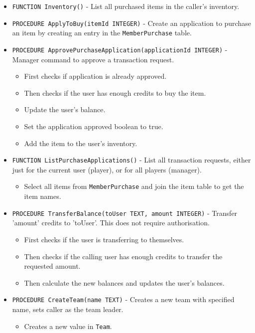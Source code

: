 \begin{itemize}
    \item \verb|FUNCTION Inventory()| - List all purchased items in the caller's inventory.
    \item \verb|PROCEDURE ApplyToBuy(itemId INTEGER)| - Create an application to purchase an item by creating an entry in the \verb|MemberPurchase| table.
    \item \verb|PROCEDURE ApprovePurchaseApplication(applicationId INTEGER)| - Manager command to approve a transaction request.
        \begin{itemize}
            \item First checks if application is already approved.
            \item Then checks if the user has enough credits to buy the item.
            \item Update the user's balance.
            \item Set the application approved boolean to true.
            \item Add the item to the user's inventory.
        \end{itemize}
    \item \verb|FUNCTION ListPurchaseApplications()| - List all transaction requests, either just for the current user (player), or for all players (manager).
        \begin{itemize}
            \item Select all items from \verb|MemberPurchase| and join the item table to get the item names.
        \end{itemize}
    \item \verb|PROCEDURE TransferBalance(toUser TEXT, amount INTEGER)| - Transfer 'amount' credits to 'toUser'. This does not require authorisation.
        \begin{itemize}
            \item First checks if the user is transferring to themselves.
            \item Then checks if the calling user has enough credits to transfer the requested amount.
            \item Then calculate the new balances and updates the user's balances.
        \end{itemize}
    \item \verb|PROCEDURE CreateTeam(name TEXT)| - Creates a new team with specified name, sets caller as the team leader.
        \begin{itemize}
            \item Creates a new value in \verb|Team|.

\end{itemize}
\end{itemize}
